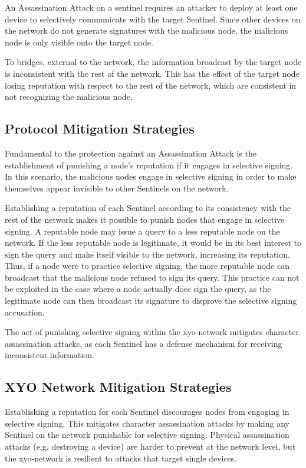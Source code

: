 \documentclass{article}
\begin{document}
An Assassination Attack on a \Gls{sentinel} requires an attacker to deploy at least one device to selectively communicate with the target Sentinel. Since other devices on the network do not generate signatures with the malicious node, the malicious node is only visible onto the target node.

To \gls{bridge}s, external to the network, the information broadcast by the target node is inconsistent with the rest of the network. This has the effect of the target node losing reputation with respect to the rest of the network, which are consistent in not recognizing the malicious node.

\subsection{Protocol Mitigation Strategies}

Fundamental to the protection against an Assassination Attack is the establishment of punishing a node's reputation if it engages in selective signing. In this scenario, the malicious nodes engage in selective signing in order to make themselves appear invisible to other Sentinels on the network.

Establishing a reputation of each Sentinel according to its consistency with the rest of the network makes it possible to punish nodes that engage in selective signing. A reputable node may issue a query to a less reputable node on the network. If the less reputable node is legitimate, it would be in its best interest to sign the query and make itself visible to the network, increasing its reputation. Thus, if a node were to practice selective signing, the more reputable node can broadcast that the malicious node refused to sign its query. This practice can not be exploited in the case where a node actually does sign the query, as the legitimate node can then broadcast its signature to disprove the selective signing accusation.

The act of punishing selective signing within the \Gls{xyo-network} mitigates character assassination attacks, as each Sentinel has a defense mechanism for receiving inconsistent information.

\subsection{XYO Network Mitigation Strategies}

Establishing a reputation for each Sentinel discourages nodes from engaging in selective signing. This mitigates character assassination attacks by making any Sentinel on the network punishable for selective signing. Physical assassination attacks (e.g. destroying a device) are harder to prevent at the network level, but the \Gls{xyo-network} is resilient to attacks that target single devices.
\end{document}
